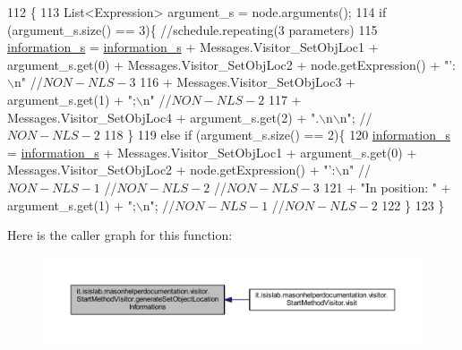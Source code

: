 \begin{DoxyCode}
112                                                                               \{
113         List<Expression> argument\_s = node.arguments();
114         \textcolor{keywordflow}{if} (argument\_s.size() == 3)\{    \textcolor{comment}{//schedule.repeating(3 parameters)}
115             \hyperlink{classit_1_1isislab_1_1masonhelperdocumentation_1_1visitor_1_1_start_method_visitor_a59b86134adb11f995ce96c1a96b51d50}{information\_s} = \hyperlink{classit_1_1isislab_1_1masonhelperdocumentation_1_1visitor_1_1_start_method_visitor_a59b86134adb11f995ce96c1a96b51d50}{information\_s} + Messages.Visitor\_SetObjLoc1 + 
      argument\_s.get(0) + Messages.Visitor\_SetObjLoc2 + node.getExpression() + \textcolor{stringliteral}{"': \(\backslash\)n"} \textcolor{comment}{//$NON-NLS-3$}
116                                 + Messages.Visitor\_SetObjLoc3 + argument\_s.get(1) + \textcolor{stringliteral}{";\(\backslash\)n"} \textcolor{comment}{//$NON-NLS-2$}
117                                 + Messages.Visitor\_SetObjLoc4 + argument\_s.get(2) + \textcolor{stringliteral}{".\(\backslash\)n\(\backslash\)n"}; \textcolor{comment}{//$NON-NLS-2$}
118         \}
119         \textcolor{keywordflow}{else} \textcolor{keywordflow}{if} (argument\_s.size() == 2)\{
120             \hyperlink{classit_1_1isislab_1_1masonhelperdocumentation_1_1visitor_1_1_start_method_visitor_a59b86134adb11f995ce96c1a96b51d50}{information\_s} = \hyperlink{classit_1_1isislab_1_1masonhelperdocumentation_1_1visitor_1_1_start_method_visitor_a59b86134adb11f995ce96c1a96b51d50}{information\_s} + Messages.Visitor\_SetObjLoc1 + 
      argument\_s.get(0) + Messages.Visitor\_SetObjLoc2 + node.getExpression() + \textcolor{stringliteral}{"':\(\backslash\)n"} \textcolor{comment}{//$NON-NLS-1$ //$NON-NLS-2$
       //$NON-NLS-3$}
121                     + \textcolor{stringliteral}{"In position: "} + argument\_s.get(1) + \textcolor{stringliteral}{";\(\backslash\)n"}; \textcolor{comment}{//$NON-NLS-1$ //$NON-NLS-2$}
122         \}
123     \}
\end{DoxyCode}


Here is the caller graph for this function\-:\nopagebreak
\begin{figure}[H]
\begin{center}
\leavevmode
\includegraphics[width=350pt]{classit_1_1isislab_1_1masonhelperdocumentation_1_1visitor_1_1_start_method_visitor_a09299758d8f3ce54b04db73271dde0da_icgraph}
\end{center}
\end{figure}


